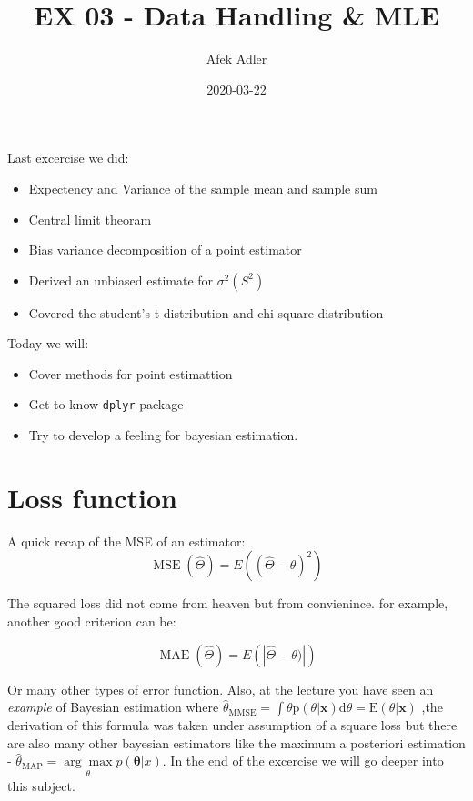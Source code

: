 \documentclass[]{article}
\title{EX 03 - Data Handling \& MLE}
\author{Afek Adler}
\date{2020-03-22}
\providecommand{\tightlist}{%
  \setlength{\itemsep}{0pt}\setlength{\parskip}{0pt}}
\begin{document}
\maketitle

Last excercise we did:

\begin{itemize}
\tightlist
\item
  Expectency and Variance of the sample mean and sample sum
\item
  Central limit theoram
\item
  Bias variance decomposition of a point estimator
\item
  Derived an unbiased estimate for \(\sigma^{2}(S^{2})\)
\item
  Covered the student's t-distribution and chi square distribution
\end{itemize}

Today we will:

\begin{itemize}
\tightlist
\item
  Cover methods for point estimattion
\item
  Get to know \texttt{dplyr} package
\item
  Try to develop a feeling for bayesian estimation.
\end{itemize}

\hypertarget{loss-function}{%
\section{Loss function}\label{loss-function}}

A quick recap of the MSE of an estimator:
\[\operatorname{MSE}(\hat{\Theta})=E((\hat{\Theta}-\theta)^{2})\]

The squared loss did not come from heaven but from convienince. for
example, another good criterion can be:

\[\operatorname{MAE}(\hat{\Theta})=E(|\hat{\Theta}-\theta)|)\]

Or many other types of error function. Also, at the lecture you have
seen an \emph{example} of Bayesian estimation where
\(\hat{\theta}_{\mathrm{MMSE}}=\int \theta \mathrm{p}(\theta | \mathbf{x}) \mathrm{d} \theta=\mathrm{E}(\theta | \mathbf{x})\)
,the derivation of this formula was taken under assumption of a square
loss but there are also many other bayesian estimators like the maximum
a posteriori estimation -
\(\hat{\theta}_{\mathrm{MAP}}=\underset{\theta}{\arg \max } p(\mathbf{\theta}| x)\).
In the end of the excercise we will go deeper into this subject.
\end{document}
